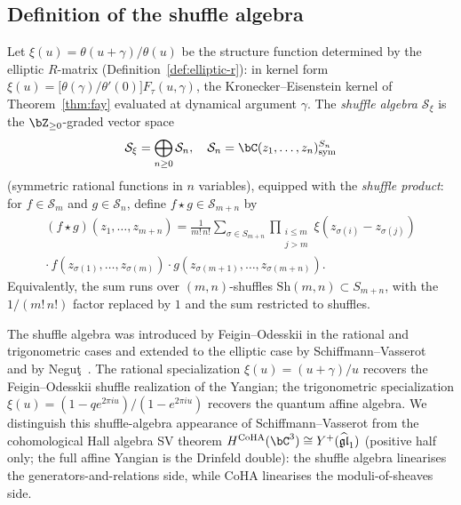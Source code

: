 \subsection{Definition of the shuffle algebra}
\label{subsec:shuffle-def}

\begin{definition}\label{def:shuffle-algebra}
Let $\xi(u) = \theta(u+\gamma)/\theta(u)$ be the structure function
determined by the elliptic $R$-matrix (Definition~\ref{def:elliptic-r}): in kernel form
$\xi(u) = \bigl[\theta(\gamma)/\theta'(0)\bigr] F_\tau(u,\gamma)$,
the Kronecker--Eisenstein kernel of Theorem~\ref{thm:fay} evaluated
at dynamical argument $\gamma$.
The \emph{shuffle algebra} $\mathcal{S}_\xi$ is the $\bZ_{\geq 0}$-graded
vector space
\[
\mathcal{S}_\xi = \bigoplus_{n \geq 0} \mathcal{S}_n, \quad
\mathcal{S}_n = \bC(z_1, \ldots, z_n)^{S_n}_{\mathrm{sym}}
\]
(symmetric rational functions in $n$ variables), equipped with
the \emph{shuffle product}:
for $f \in \mathcal{S}_m$ and $g \in \mathcal{S}_n$, define
$f \star g \in \mathcal{S}_{m+n}$ by
\begin{multline}\label{eq:shuffle-product}
(f \star g)(z_1, \ldots, z_{m+n})
= \frac{1}{m!\,n!} \sum_{\sigma \in S_{m+n}}
\prod_{\substack{i \leq m \\ j > m}}
\xi(z_{\sigma(i)} - z_{\sigma(j)}) \\
\cdot\, f(z_{\sigma(1)}, \ldots, z_{\sigma(m)})
\cdot g(z_{\sigma(m+1)}, \ldots, z_{\sigma(m+n)}).
\end{multline}
Equivalently, the sum runs over $(m,n)$-shuffles
$\mathrm{Sh}(m,n) \subset S_{m+n}$, with
the $1/(m!\,n!)$ factor replaced by $1$ and the
sum restricted to shuffles.
\end{definition}

\begin{remark}[Origin]\label{rem:shuffle-origin}
The shuffle algebra was introduced by
Feigin--Odesskii in the rational and
trigonometric cases and extended to the elliptic case by
Schiffmann--Vasserot~\cite{SV13} and by Negu\c{t}~\cite{Neg14}.
The rational specialization $\xi(u) = (u+\gamma)/u$
recovers the Feigin--Odesskii shuffle realization of the
Yangian; the trigonometric specialization
$\xi(u) = (1 - q e^{2\pi i u})/(1 - e^{2\pi i u})$
recovers the quantum affine algebra. We distinguish this shuffle-algebra appearance of Schiffmann--Vasserot from the cohomological Hall algebra SV theorem $H^{\mathrm{CoHA}}(\bC^3) \cong Y^+(\widehat{\mathfrak{gl}}_1)$ (positive half only; the full affine Yangian is the Drinfeld double): the shuffle algebra linearises the generators-and-relations side, while CoHA linearises the moduli-of-sheaves side.
\end{remark}

